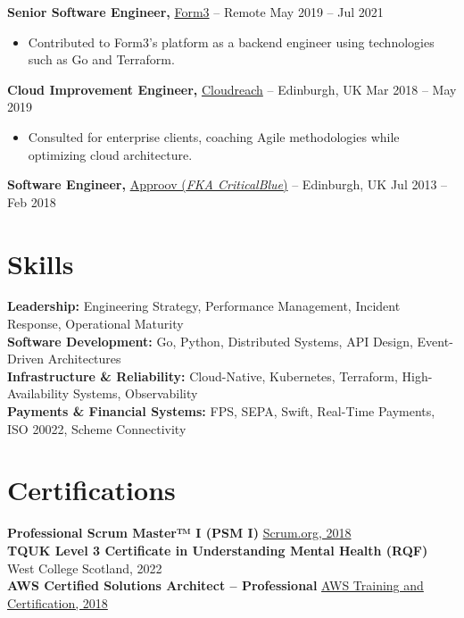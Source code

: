 \documentclass[11pt]{article}       %
\begin{document}
\textbf{Senior Software Engineer,} \href{https://form3.tech/}{Form3} -- Remote \hfill May 2019 -- Jul 2021 \\
\vspace{-9pt}
\begin{itemize}
  \item Contributed to Form3's platform as a backend engineer using technologies such as Go and Terraform.
\end{itemize}

\textbf{Cloud Improvement Engineer,} \href{https://eviden.com/about-us/legacy-brands/cloudreach/}{Cloudreach} -- Edinburgh, UK \hfill Mar 2018 -- May 2019 \\
\vspace{-9pt}
\begin{itemize}
  \item Consulted for enterprise clients, coaching Agile methodologies while optimizing cloud architecture.
\end{itemize}

\textbf{Software Engineer,} \href{https://approov.io/}{Approov (\textit{FKA CriticalBlue})} -- Edinburgh, UK \hfill Jul 2013 -- Feb 2018 \\ 
\vspace{-6.5pt}


\section*{Skills}
\textbf{Leadership:} Engineering Strategy, Performance Management, Incident Response, Operational Maturity \\
\textbf{Software Development:} Go, Python, Distributed Systems, API Design, Event-Driven Architectures \\
\textbf{Infrastructure \& Reliability:} Cloud-Native, Kubernetes, Terraform, High-Availability Systems, Observability \\
\textbf{Payments \& Financial Systems:} FPS, SEPA, Swift, Real-Time Payments, ISO 20022, Scheme Connectivity

\vspace{-6.5pt}

\section*{Certifications}
\textbf{Professional Scrum Master™ I (PSM I)} \hfill \href{https://www.credly.com/users/devenney}{Scrum.org, 2018} \\
\textbf{TQUK Level 3 Certificate in Understanding Mental Health (RQF)} \hfill West College Scotland, 2022 \\
\textbf{AWS Certified Solutions Architect – Professional} \hfill \href{https://www.credly.com/users/devenney}{AWS Training and Certification, 2018} \\
\end{document}
